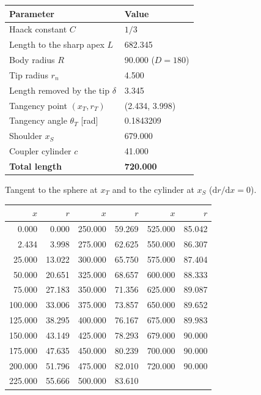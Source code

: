 \documentclass[10pt,a4paper]{article}
\begin{document}
\begin{minipage}[t]{0.44\linewidth}\vspace{0pt}\small
\begin{tabular}{@{}ll@{}}
\toprule
Parameter & Value\\
\midrule
Haack constant $C$ & $1/3$\\
Length to the sharp apex $L$ & 682.345\\
Body radius $R$ & 90.000 ($D = 180$)\\
Tip radius $r_n$ & 4.500\\
Length removed by the tip $\delta$ & 3.345\\
Tangency point $(x_T, r_T)$ & (2.434, 3.998)\\
Tangency angle $\theta_T$ [rad] & 0.1843209\\
Shoulder $x_S$ & 679.000\\
Coupler cylinder $c$ & 41.000\\
\textbf{Total length} & \textbf{720.000}\\
\bottomrule
\end{tabular}

\smallskip
Tangent to the sphere at $x_T$ and to the cylinder at $x_S$ ($\mathrm{d}r/\mathrm{d}x = 0$).
\end{minipage}\hfill
\begin{minipage}[t]{0.53\linewidth}\vspace{0pt}\scriptsize
\begin{tabular}{@{}rr|rr|rr@{}}
\toprule
$x$ & $r$ & $x$ & $r$ & $x$ & $r$\\
\midrule
0.000 & 0.000 & 250.000 & 59.269 & 525.000 & 85.042 \\
2.434 & 3.998 & 275.000 & 62.625 & 550.000 & 86.307 \\
25.000 & 13.022 & 300.000 & 65.750 & 575.000 & 87.404 \\
50.000 & 20.651 & 325.000 & 68.657 & 600.000 & 88.333 \\
75.000 & 27.183 & 350.000 & 71.356 & 625.000 & 89.087 \\
100.000 & 33.006 & 375.000 & 73.857 & 650.000 & 89.652 \\
125.000 & 38.295 & 400.000 & 76.167 & 675.000 & 89.983 \\
150.000 & 43.149 & 425.000 & 78.293 & 679.000 & 90.000 \\
175.000 & 47.635 & 450.000 & 80.239 & 700.000 & 90.000 \\
200.000 & 51.796 & 475.000 & 82.010 & 720.000 & 90.000 \\
225.000 & 55.666 & 500.000 & 83.610 &  &  \\
\bottomrule
\end{tabular}
\end{minipage}
\end{document}
